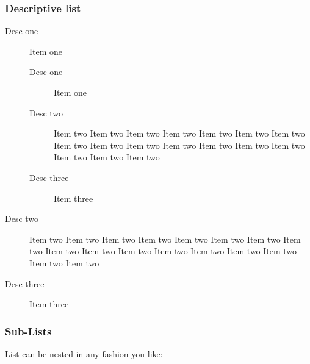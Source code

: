 \subsubsection{Descriptive list}

\begin{description}
  \item[Desc one] Item one
  \begin{description}
    \item[Desc one] Item one
    \item[Desc two] Item two Item two Item two Item two Item two Item
two Item two Item two Item two Item two Item two Item two Item two
Item two Item two Item two Item two
    \item[Desc three] Item three
  \end{description}
  \item[Desc two] Item two Item two Item two Item two Item two Item
two Item two Item two Item two Item two Item two Item two Item two
Item two Item two Item two Item two
  \item[Desc three] Item three
\end{description}

\subsubsection{Sub-Lists}

List can be nested in any fashion you like:

